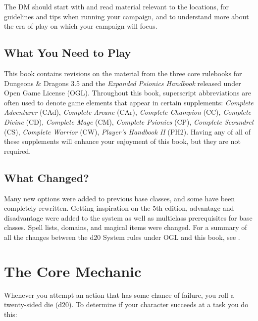 The DM should start with  and read material relevant to the locations,  for guidelines and tips when running your campaign, and  to understand more about the era of play on which your campaign will focus.

\subsection{What You Need to Play}
This book contains revisions on the material from the three core rulebooks for {\tableheader Dungeons \& Dragons 3.5} and the \emph{Expanded Psionics Handbook} released under Open Game License (OGL). Throughout this book, superscript abbreviations are often used to denote game elements that appear in certain supplements: \emph{Complete Adventurer} (CAd), \emph{Complete Arcane} (CAr), \emph{Complete Champion} (CC), \emph{Complete Divine} (CD), \emph{Complete Mage} (CM), \emph{Complete Psionics} (CP), \emph{Complete Scoundrel} (CS), \emph{Complete Warrior} (CW), \emph{Player's Handbook II} (PH2). Having any of all of these supplements will enhance your enjoyment of this book, but they are not required.

\subsection{What Changed?}
Many new options were added to previous base classes, and some have been completely rewritten. Getting inspiration on the 5th edition, advantage and disadvantage were added to the system as well as multiclass prerequisites for base classes. Spell lists, domains, and magical items were changed. For a summary of all the changes between the d20 System rules under OGL and this book, see .



\clearpage
\section{The Core Mechanic}
Whenever you attempt an action that has some chance of failure, you roll a twenty-sided die (d20). To determine if your character succeeds at a task you do this:

